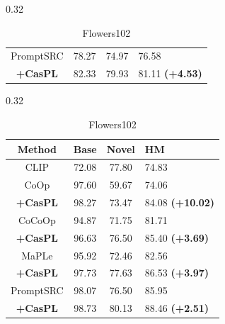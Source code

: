 \documentclass[runningheads]{llncs}
\newcommand{\improve}[1]{\textcolor{boost_line}{\textbf{#1}}}
\begin{document}
{{\begin{table}[!t]
\begin{subtable}[t]{0.32\linewidth}
{\begin{tabular}{c|ccl}
            \hline
            PromptSRC & 78.27 & 74.97 & 76.58 \\
            \rowcolor{tablecolor} \textbf{+CasPL} &82.33 	&79.93 	&81.11  \improve{(+4.53)} \\
            \hline
        \end{tabular}
        }
        \caption{StanfordCars}
    \end{subtable}
    \begin{subtable}[t]{0.32\linewidth}
        \resizebox{0.96\linewidth}{!}
        {
        \begin{tabular}{c|ccl}
            \hline
            Method    & Base  & Novel & HM \\
            \hline
            CLIP & 72.08 & 77.80 & 74.83 \\
            \hline
            CoOp & 97.60 & 59.67 & 74.06 \\
            \rowcolor{tablecolor} \textbf{+CasPL} &98.27 	&73.47 	&84.08    \small{\improve{(+10.02)}}   \\
            \hline
            CoCoOp & 94.87 & 71.75 & 81.71 \\
            \rowcolor{tablecolor} \textbf{+CasPL} &96.63 	&76.50 	&85.40   \improve{(+3.69)}  \\
            \hline
            MaPLe & 95.92 & 72.46 & 82.56 \\
            \rowcolor{tablecolor} \textbf{+CasPL} &97.73 	&77.63 	&86.53  \improve{(+3.97)}   \\
            \hline
            PromptSRC & 98.07 & 76.50 & 85.95 \\
            \rowcolor{tablecolor} \textbf{+CasPL} &98.73 	&80.13 	&88.46  \improve{(+2.51)} \\
            \hline
        \end{tabular}
        }
        \caption{Flowers102}
    \end{subtable}



\end{table}}}
\end{document}
